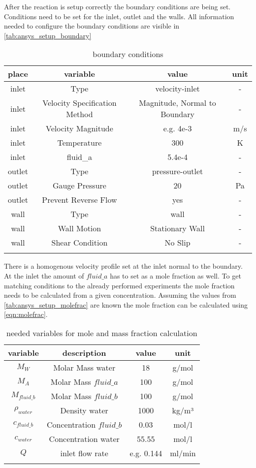 \documentclass[../thesis.tex]{subfiles}
\begin{document}
After the reaction is setup correctly the boundary conditions are being set. Conditions need to be set for the inlet, outlet and the walls. All information needed to configure the boundary conditions are visible in \autoref{tab:ansys_setup_boundary}

\begin{table} [htb]
	\centering
	\caption{boundary conditions}
	\begin{tabular}{ cccc }
		\hline
		place & variable & value & unit \\
		\hline
		inlet & Type & velocity-inlet & - \\
		inlet & Velocity Specification Method & Magnitude, Normal to Boundary & - \\
		inlet & Velocity Magnitude & e.g. 4e-3 & m/s \\
		inlet & Temperature & 300 & K \\
		inlet & fluid\_a & 5.4e-4 & - \\
		outlet & Type & pressure-outlet & - \\
		outlet & Gauge Pressure & 20 & Pa \\
		outlet & Prevent Reverse Flow & yes & - \\
		wall & Type & wall & - \\
		wall & Wall Motion & Stationary Wall & - \\
		wall & Shear Condition & No Slip & - \\
		\hline
		\label{tab:ansys_setup_boundary}
	\end{tabular}
\end{table}
There is a homogenous velocity profile set at the inlet normal to the boundary. At the inlet the amount of $fluid\_a$ has to set as a mole fraction as well. To get matching conditions to the already performed experiments the mole fraction needs to be calculated from a given concentration. Assuming the values from \autoref{tab:ansys_setup_molefrac} are known the mole fraction can be calculated using \autoref{eqn:molefrac}.

\begin{table} [htb]
	\centering
	\caption{needed variables for mole and mass fraction calculation}
	\begin{tabular}{ cccc }
		\hline
		variable & description & value & unit \\
		\hline
		$M_{W}$ & Molar Mass water & 18 & g/mol \\
		$M_{A}$ & Molar Mass $fluid\_a$ & 100 & g/mol \\
		$M_{fluid\_b}$ & Molar Mass $fluid\_b$ & 100 & g/mol \\
		$\rho_{water}$ & Density water & 1000 & kg/m³ \\
		$c_{fluid\_b}$ & Concentration $fluid\_b$ & 0.03 & mol/l \\
		$c_{water}$ & Concentration water & 55.55 & mol/l \\
		$Q$ & inlet flow rate &  e.g. 0.144 & ml/min \\
		\hline
		\label{tab:ansys_setup_molefrac}
	\end{tabular}
\end{table}
\end{document}
